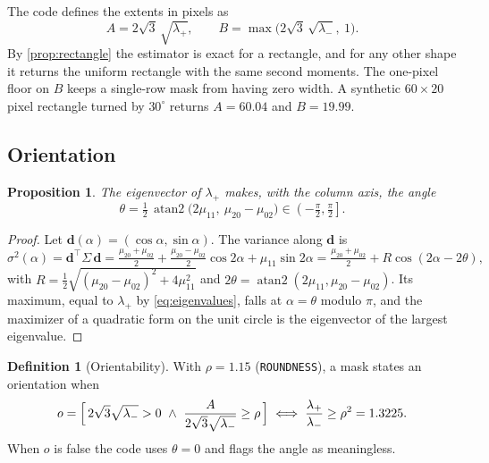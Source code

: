 \documentclass[11pt,a4paper]{article}
\newtheorem{proposition}{Proposition}
\theoremstyle{definition}
\newtheorem{definition}{Definition}
\theoremstyle{remark}
\newcommand{\code}[1]{\texttt{#1}}
\DeclareMathOperator{\atantwo}{atan2}
\begin{document}
The code defines the extents in pixels as
\begin{equation}
\label{eq:extents}
A = 2\sqrt3\,\sqrt{\lambda_+},\qquad
B = \max\bigl(2\sqrt3\,\sqrt{\lambda_-},\ 1\bigr).
\end{equation}
By \cref{prop:rectangle} the estimator is exact for a rectangle, and for any
other shape it returns the uniform rectangle with the same second moments. The
one-pixel floor on $B$ keeps a single-row mask from having zero width. A
synthetic $60\times20$ pixel rectangle turned by $30^\circ$ returns $A = 60.04$
and $B = 19.99$.

\subsection{Orientation}

\begin{proposition}
\label{prop:angle}
The eigenvector of $\lambda_+$ makes, with the column axis, the angle
\begin{equation}
\label{eq:theta}
\theta = \tfrac12\,\atantwo\bigl(2\mu_{11},\ \mu_{20}-\mu_{02}\bigr)
\in \left(-\tfrac{\pi}{2}, \tfrac{\pi}{2}\right].
\end{equation}
\end{proposition}
\begin{proof}
Let $\mathbf{d}(\alpha) = (\cos\alpha, \sin\alpha)$. The variance along
$\mathbf{d}$ is
\[
\sigma^2(\alpha) = \mathbf{d}^\top\Sigma\,\mathbf{d}
= \tfrac{\mu_{20}+\mu_{02}}{2} + \tfrac{\mu_{20}-\mu_{02}}{2}\cos2\alpha + \mu_{11}\sin2\alpha
= \tfrac{\mu_{20}+\mu_{02}}{2} + R\cos(2\alpha - 2\theta),
\]
with $R = \tfrac12\sqrt{(\mu_{20}-\mu_{02})^2+4\mu_{11}^2}$ and $2\theta =
\atantwo(2\mu_{11}, \mu_{20}-\mu_{02})$. Its maximum, equal to $\lambda_+$ by
\eqref{eq:eigenvalues}, falls at $\alpha=\theta$ modulo $\pi$, and the maximizer
of a quadratic form on the unit circle is the eigenvector of the largest
eigenvalue.
\end{proof}

\begin{definition}[Orientability]
With $\rho = 1.15$ (\code{ROUNDNESS}), a mask states an orientation when
\begin{equation}
\label{eq:oriented}
o = \Bigl[\,2\sqrt3\sqrt{\lambda_-} > 0 \ \wedge\ \frac{A}{2\sqrt3\sqrt{\lambda_-}} \ge \rho\,\Bigr]
\iff \frac{\lambda_+}{\lambda_-} \ge \rho^2 = 1.3225 .
\end{equation}
When $o$ is false the code uses $\theta = 0$ and flags the angle as meaningless.
\end{definition}
\end{document}
